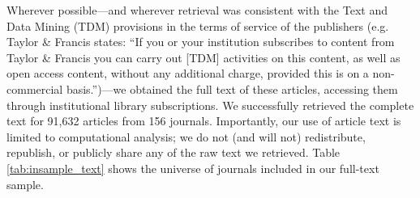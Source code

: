 \documentclass[12pt]{article}
\begin{document}
Wherever possible---and wherever retrieval was consistent with the Text and Data Mining (TDM) provisions in the terms of service of the publishers (e.g. Taylor \& Francis states: ``If you or your institution subscribes to content from Taylor \& Francis you can carry out [TDM] activities on this content, as well as open access content, without any additional charge, provided this is on a non-commercial basis.'')---we obtained the full text of these articles, accessing them through institutional library subscriptions. We successfully retrieved the complete text for 91,632 articles from 156 journals. Importantly, our use of article text is limited to computational analysis; we do not (and will not) redistribute, republish, or publicly share any of the raw text we retrieved. Table \ref{tab:insample_text} shows the universe of journals included in our full-text sample. 

\setlength\LTleft{0pt}
\setlength\LTright{0pt}

\end{document}
